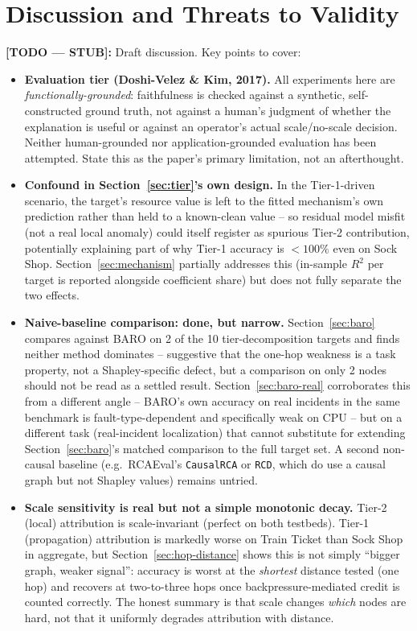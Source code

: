 \documentclass[journal, 10pt]{IEEEtran}
\begin{document}
\section{Discussion and Threats to Validity}
\label{sec:discussion}
\textbf{[TODO --- STUB]:} Draft discussion. Key points to cover:
\begin{itemize}
    \item \textbf{Evaluation tier (Doshi-Velez \& Kim, 2017).} All experiments here are \emph{functionally-grounded}: faithfulness is checked against a synthetic, self-constructed ground truth, not against a human's judgment of whether the explanation is useful or against an operator's actual scale/no-scale decision. Neither human-grounded nor application-grounded evaluation has been attempted. State this as the paper's primary limitation, not an afterthought.
    \item \textbf{Confound in Section~\ref{sec:tier}'s own design.} In the Tier-1-driven scenario, the target's resource value is left to the fitted mechanism's own prediction rather than held to a known-clean value -- so residual model misfit (not a real local anomaly) could itself register as spurious Tier-2 contribution, potentially explaining part of why Tier-1 accuracy is $<100\%$ even on Sock Shop. Section~\ref{sec:mechanism} partially addresses this (in-sample $R^2$ per target is reported alongside coefficient share) but does not fully separate the two effects.
    \item \textbf{Naive-baseline comparison: done, but narrow.} Section~\ref{sec:baro} compares against BARO on 2 of the 10 tier-decomposition targets and finds neither method dominates -- suggestive that the one-hop weakness is a task property, not a Shapley-specific defect, but a comparison on only 2 nodes should not be read as a settled result. Section~\ref{sec:baro-real} corroborates this from a different angle -- BARO's own accuracy on real incidents in the same benchmark is fault-type-dependent and specifically weak on CPU -- but on a different task (real-incident localization) that cannot substitute for extending Section~\ref{sec:baro}'s matched comparison to the full target set. A second non-causal baseline (e.g.\ RCAEval's \texttt{CausalRCA} or \texttt{RCD}, which do use a causal graph but not Shapley values) remains untried.
    \item \textbf{Scale sensitivity is real but not a simple monotonic decay.} Tier-2 (local) attribution is scale-invariant (perfect on both testbeds). Tier-1 (propagation) attribution is markedly worse on Train Ticket than Sock Shop in aggregate, but Section~\ref{sec:hop-distance} shows this is not simply ``bigger graph, weaker signal'': accuracy is worst at the \emph{shortest} distance tested (one hop) and recovers at two-to-three hops once backpressure-mediated credit is counted correctly. The honest summary is that scale changes \emph{which} nodes are hard, not that it uniformly degrades attribution with distance.
\end{itemize}
\end{document}
